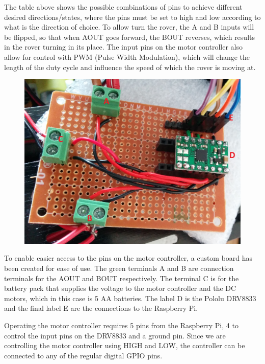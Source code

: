 The table above shows the possible combinations of pins to achieve different desired directions/states, where the pins must be set to high and low according to what is the direction of choice. To allow turn the rover, the A and B inputs will be flipped, so that when AOUT goes forward, the BOUT reverses, which results in the rover turning in its place.
The input pins on the motor controller also allow for control with PWM (Pulse Width Modulation), which will change the length of the duty cycle and influence the speed of which the rover is moving at\cite{DRV8833}.

\begin{figure}[H]
	\centering
	\includegraphics[width=.5\linewidth]{images/labelled.jpg}
\end{figure}

To enable easier access to the pins on the motor controller, a custom board has been created for ease of use. The green terminals A and B are connection terminals for the AOUT and BOUT respectively. The terminal C is for the battery pack that supplies the voltage to the motor controller and the DC motors, which in this case is 5 AA batteries. The label D is the Pololu DRV8833 and the final label E are the connections to the Raspberry Pi. 

Operating the motor controller requires 5 pins from the Raspberry Pi, 4 to control the input pins on the DRV8833 and a ground pin. Since we are controlling the motor controller using HIGH and LOW, the controller can be connected to any of the regular digital GPIO pins.